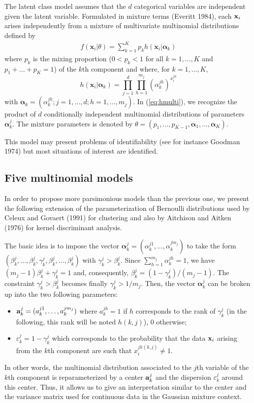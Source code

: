 \documentclass[12pt]{article}
\newcommand{\bx}{\mathbf{x}}
\newcommand{\balpha}{\boldsymbol{\alpha}}
\begin{document}
The latent class model assumes that the $d$ categorical variables are independent given the latent
variable. Formulated in mixture terms (Everitt 1984), each ${\bf x}_i$ arises independently
from a mixture of multivariate multinomial distributions defined by
\begin{eqnarray}
  f(\bx_i|\theta) = \sum_{k=1}^K p_k h(\bx_i|\balpha_k)
\end{eqnarray}
where $p_k$ is the mixing proportion ($0<p_k<1$ for all $k=1,...,K$ and $p_1+...+p_K=1$) of the
$k$th component and where, for $k=1,\ldots,K$,
\begin{equation}
  \label{eq:hmulti}
  h(\bx_i|\balpha_k) = \prod_{j=1}^d \prod_{h=1}^{m_j} (\alpha_k^{jh})^{x_i^{jh}}
\end{equation}
with $\balpha_k = (\alpha_k^{jh};j=1,\ldots,d;h=1,\ldots,m_j)$. In (\ref{eq:hmulti}), we
recognize the product of $d$ conditionally independent multinomial distributions of parameters
$\balpha_k^j$.  The mixture parameters is denoted by
$\theta=\left(p_1,\ldots,p_{K-1},\balpha_1,\ldots,\balpha_K\right)$.

This model may present problems of identifiability (see for instance Goodman 1974) but most
situations of interest are identified.

\subsection{Five multinomial models}
In order to propose more parsimonious models than the previous one, we present the following
extension of the parameterization of Bernoulli distributions used by Celeux and Govaert (1991)
for clustering and also by Aitchison and Aitken (1976) for kernel discriminant analysis.

The basic idea is to impose the vector $\balpha_k^j = (\alpha_k^{j1},\ldots,\alpha_k^{jm_j})$
to take the form $(\beta_k^j,\ldots,\beta_k^j,\gamma_k^j,\beta_k^j,\ldots,\beta_k^j)$ with
$\gamma_k^j > \beta_k^j$. Since $\sum_{h=1}^{m_j} \alpha_k^{jh}=1$, we have
$(m_j-1)\beta_k^j+\gamma_k^j = 1$ and, consequently, $\beta_k^j=(1-\gamma_k^j)/(m_j-1)$. The
constraint $\gamma_k^j>\beta_k^j$ becomes finally $\gamma_k^j > 1 /m_j$.  Then, the vector
$\balpha_k^j$ can be broken up into the two following parameters:
\begin{itemize}
\item ${\bf a}_k^j = (a_k^{j1},\ldots,a_k^{jm_j})$ where $a_k^{jh} = 1$ if $h$ corresponds to
  the rank of $\gamma_k^j$ (in the following, this rank will be noted $h(k,j)$), 0 otherwise;
\item $\varepsilon_k^j = 1 - \gamma_k^j$ which corresponds to the probability that the data
  ${\bf x}_i$ arising from the $k$th component are such that $x_i^{jh(k,j)} \neq 1$.
\end{itemize}
In other words, the multinomial distribution associated to the $j$th variable of the $k$th
component is reparameterized by a center ${\bf a}_k^j$ and the dispersion $\varepsilon_k^j$
around this center. Thus, it allows us to give an interpretation similar to the center and the
variance matrix used for continuous data in the Gaussian mixture context.
\end{document}
